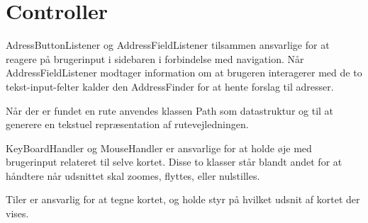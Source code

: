 \section{Controller}
\label{sec:controller}

AdressButtonListener og AddressFieldListener tilsammen ansvarlige for at reagere på brugerinput i sidebaren i forbindelse med navigation. Når AddressFieldListener modtager information om at brugeren interagerer med de to tekst-input-felter kalder den AddressFinder for at hente forslag til adresser.

Når der er fundet en rute anvendes klassen Path som datastruktur og til at generere en tekstuel repræsentation af rutevejledningen.

KeyBoardHandler og MouseHandler er ansvarlige for at holde øje med brugerinput relateret til selve kortet. Disse to klasser står blandt andet for at håndtere når udsnittet skal zoomes, flyttes, eller nulstilles.

Tiler er ansvarlig for at tegne kortet, og holde styr på hvilket udsnit af kortet der vises.